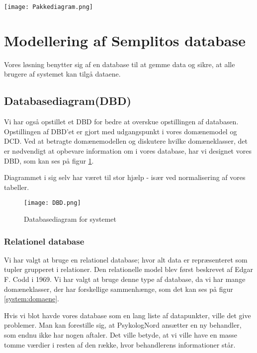 \begin{sidewaysfigure}
    \caption{Pakkediagram for systemet}
    \centering
        \texttt{[image: Pakkediagram.png]}
    \label{fig:pakkediagram}
\end{sidewaysfigure}

\section{Modellering af Semplitos database}
\label{kabitel:ModelleringDB}
Vores løsning benytter sig af en database til at gemme data og sikre, at alle brugere af systemet kan tilgå dataene.

\subsection{Databasediagram(DBD)}
\label{DBD}

Vi har også opstillet et DBD for bedre at overskue opstillingen af databasen.
Opstillingen af DBD'et er gjort med udgangspunkt i vores domænemodel og DCD.
Ved at betragte domænemodellen og diskutere hvilke domæneklasser, det er nødvendigt at opbevare information om i vores database, har vi designet vores DBD, som kan ses på figur \ref{fig:DBD}.

Diagrammet i sig selv har været til stor hjælp - især ved normalisering af vores tabeller. 

\begin{figure}[H]
    \caption{Databasediagram for systemet}
    \centering
        \texttt{[image: DBD.png]}
    \label{fig:DBD}
\end{figure}

\subsubsection{Relationel database}

Vi har valgt at bruge en relationel database; hvor alt data er repræsenteret som tupler grupperet i relationer.
Den relationelle model blev først beskrevet af Edgar F. Codd i 1969.
Vi har valgt at bruge denne type af database, da vi har mange domæneklasser, der har forskellige sammenhænge, som det kan ses på figur \ref{system:domaene}.

Hvis vi blot havde vores database som en lang liste af datapunkter, ville det give problemer.
Man kan forestille sig, at PsykologNord ansætter en ny behandler, som endnu ikke har nogen aftaler.
Det ville betyde, at vi ville have en masse tomme værdier i resten af den række, hvor behandlerens informationer står.\cite{database}

